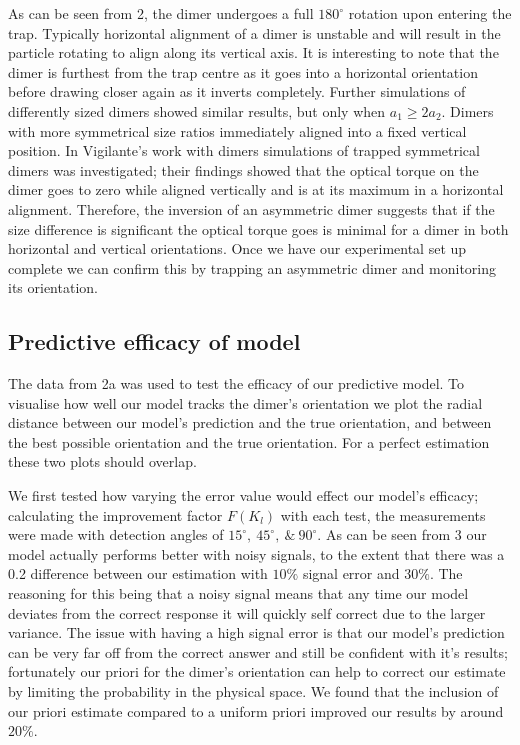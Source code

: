 \documentclass[final,3p, twocolumn]{elsarticle}
\begin{document}
As can be seen from \figurename{ 2}, the dimer undergoes a full $180^{\circ}$ rotation upon entering the trap. Typically horizontal alignment of a dimer is unstable and will result in the particle rotating to align along its vertical axis. It is interesting to note that the dimer is furthest from the trap centre as it goes into a horizontal orientation before drawing closer again as it inverts completely. Further simulations of differently sized dimers showed similar results, but only when $a_1 \geq 2a_2$. Dimers with more symmetrical size ratios immediately aligned into a fixed vertical position. 
In Vigilante's work with dimers \cite{Brownian_OT} simulations of trapped symmetrical dimers was investigated; their findings showed that the optical torque on the dimer goes to zero while aligned vertically and is at its maximum in a horizontal alignment. Therefore, the inversion of an asymmetric dimer suggests that if the size difference is significant the optical torque goes is minimal for a dimer in both horizontal and vertical orientations. Once we have our experimental set up complete we can confirm this by trapping an asymmetric dimer and monitoring its orientation. 

\subsection{Predictive efficacy of model}
\label{3.2}
The data from \figurename{ 2a} was used to test the efficacy of our predictive model. To visualise how well our model tracks the dimer's orientation we plot the radial distance between our model's prediction and the true orientation, and between the best possible orientation and the true orientation. For a perfect estimation these two plots should overlap. 

We first tested how varying the error value would effect our model's efficacy; calculating the improvement factor $F(K_l)$ with each test, the measurements were made with detection angles of $15^{\circ}, \ 45^{\circ}, \ \& \ 90^{\circ}$. As can be seen from \figurename{ 3} our model actually performs better with noisy signals, to the extent that there was a 0.2 difference between our estimation with $10 \%$ signal error and $30\%$. The reasoning for this being that a noisy signal means that any time our model deviates from the correct response it will quickly self correct due to the larger variance.  The issue with having a high signal error is that our model's prediction can be very far off from the correct answer and still be confident with it's results; fortunately our priori for the dimer's orientation can help to correct our estimate by limiting the probability in the physical space. We found that the inclusion of our priori estimate compared to a uniform priori improved our results by around $20 \%$. 
\end{document}
